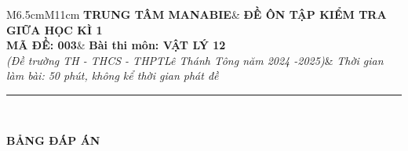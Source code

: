 \begin{tabular}{M{6.5cm}M{11cm}}
	\textbf{TRUNG TÂM MANABIE}& \textbf{ĐỀ ÔN TẬP KIỂM TRA GIỮA HỌC KÌ 1}\\
	\textbf{MÃ ĐỀ: 003}& \textbf{Bài thi môn: VẬT LÝ 12}\\
	\textit{(Đề trường TH - THCS - THPT\newline Lê Thánh Tông năm 2024 -2025)}& \textit{Thời gian làm bài: 50 phút, không kể thời gian phát đề}
	
	\noindent\rule{4cm}{0.8pt} \\
\end{tabular}
\setcounter{section}{0}
\begin{center}
	\textbf{\large BẢNG ĐÁP ÁN}
\end{center}
\section{}
\section{}
\section{}
